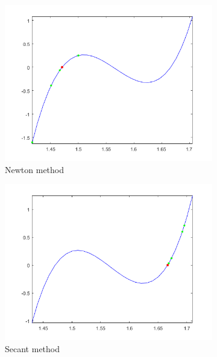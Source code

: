 \documentclass[12pt]{article}
\begin{document}
\begin{figure}[t!]
    \begin{subfigure}[t]{0.32\textwidth}
        \centering
        \includegraphics[width=\linewidth]{px_newton}
        \caption{Newton method}
        \label{fig_newton}
    \end{subfigure}
    \begin{subfigure}[t]{0.32\textwidth}
        \centering
        \includegraphics[width=\linewidth]{px_secant}
        \caption{Secant method}
        \label{fig_secant}
    \end{subfigure}
    \begin{subfigure}[t]{0.32\textwidth}
        \centering

\end{subfigure}
\end{figure}
\end{document}
